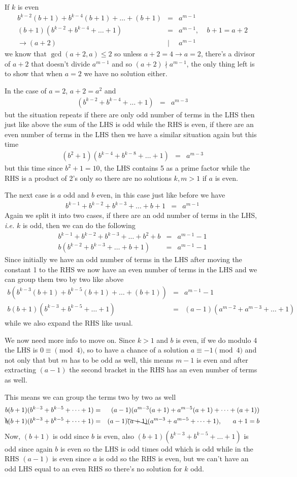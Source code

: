 \documentclass[aps,preprint,preprintnumbers,nofootinbib,showpacs,prd]{revtex4-1}
\newcommand{\ie}{{\it i.e.} }
\newcommand{\nbea}{\begin{eqnarray*}}
\newcommand{\neea}{\end{eqnarray*}}
\begin{document}
If $k$ is even
%
\nbea
b^{k-2}(b + 1) + b^{k-4}(b+1) + \dots + (b + 1) & = & a^{m-1} \\
(b+1)(b^{k-2} + b^{k-4} + \dots + 1) & = & a^{m-1}, ~~~~~ b+1 = a + 2 \\
\to (a + 2) &|& a^{m-1}
\neea
%
we know that $\gcd(a+2, a) \le 2$ so unless $a + 2 = 4 \to a = 2$, there's a divisor of $a+2$ that doesn't divide $a^{m-1}$ and so $(a+2)\nmid a^{m-1}$, the only thing left is to show that when $a = 2$ we have no solution either.

In the case of $a = 2$, $a + 2 = a^2$ and
%
\nbea
(b^{k-2} + b^{k-4} + \dots + 1) & = & a^{m-3}
\neea
%
but the situation repeats if there are only odd number of terms in the LHS then just like above the sum of the LHS is odd while the RHS is even, if there are an even number of terms in the LHS then we have a similar situation again but this time
%
\nbea
(b^2 + 1)(b^{k-4} + b^{k-8} + \dots + 1) & = & a^{m-3}
\neea
%
but this time since $b^2 + 1 = 10$, the LHS contains 5 as a prime factor while the RHS is a product of 2's only so there are no solutions $k,m>1$ if $a$ is even.

The next case is $a$ odd and $b$ even, in this case just like before we have
%
\nbea
b^{k-1} + b^{k-2} + b^{k-3} + \dots + b + 1 & = & a^{m-1}
\neea
%
Again we split it into two cases, if there are an odd number of terms in the LHS, \ie $k$ is odd, then we can do the following
%
\nbea
b^{k-1} + b^{k-2} + b^{k-3} + \dots + b^2 + b & = & a^{m-1} - 1 \\
b(b^{k-2} + b^{k-3} + \dots + b + 1 )& = & a^{m-1} - 1
\neea
%
Since initially we have an odd number of terms in the LHS after moving the constant 1 to the RHS we now have an even number of terms in the LHS and we can group them two by two like above
%
\nbea
b(b^{k-3}(b + 1) + b^{k-5}(b + 1) + \dots + (b + 1) )& = & a^{m-1} - 1 \\
b(b+1)(b^{k-3} + b^{k-5} + \dots + 1) & = & (a - 1)(a^{m-2} + a^{m-3} + \dots + 1)
\neea
%
while we also expand the RHS like usual. 

We now need more info to move on. Since $k > 1$ and $b$ is even, if we do modulo 4 the LHS is $0 \equiv \pmod{4}$, so to have a chance of a solution $a \equiv -1 \pmod{4}$ and not only that but $m$ has to be odd as well, this means $m-1$ is even and after extracting $(a-1)$ the second bracket in the RHS has an even number of terms as well.

This means we can group the terms two by two as well
%
\nbea
b(b+1)(b^{k-3} + b^{k-5} + \dots + 1) & = & (a - 1)(a^{m-3}(a + 1) + a^{m-5}(a+1) + \dots  + (a+ 1)) \\
\bcancel{b}(b+1)(b^{k-3} + b^{k-5} + \dots + 1) & = & (a - 1)\bcancel{(a + 1)}(a^{m-3} + a^{m-5} + \dots + 1),~~~~~a+1=b
\neea
%
Now, $(b + 1)$ is odd since $b$ is even, also $(b+1)(b^{k-3} + b^{k-5} + \dots + 1)$ is odd since again $b$ is even so the LHS is odd times odd which is odd while in the RHS $(a - 1)$ is even since $a$ is odd so the RHS is even, but we can't have an odd LHS equal to an even RHS so there's no solution for $k$ odd.
\end{document}
